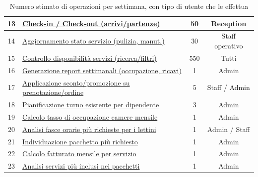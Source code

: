 \documentclass[a4paper,12pt]{report}
\begin{document}
\begin{table}[H]
\begin{tabularx}{\textwidth}{|c|>{\raggedright\arraybackslash}X|c|c|}
		\hline
		13          & \hyperref[op13]{Check-in / Check-out (arrivi/partenze)}                & 50                & Reception              \\
		\hline
		14          & \hyperref[op14]{Aggiornamento stato servizio (pulizia, manut.)}        & 30                & Staff operativo        \\
		\hline
		15          & \hyperref[op15]{Controllo disponibilità servizi (ricerca/filtri)}      & 550               & Tutti                  \\
		\hline
		16          & \hyperref[op16]{Generazione report settimanali (occupazione, ricavi)}  & 1                 & Admin                  \\
		\hline
		17          & \hyperref[op17]{Applicazione sconto/promozione su prenotazione/ordine} & 5                 & Staff / Admin          \\
		\hline
		18          & \hyperref[op18]{Pianificazione turno esistente per dipendente}         & 3                 & Admin                  \\
		\hline
		19          & \hyperref[op19]{Calcolo tasso di occupazione camere mensile}           & 1                 & Admin                  \\
		\hline
		20          & \hyperref[op20]{Analisi fasce orarie più richieste per i lettini}      & 1                 & Admin / Staff          \\
		\hline
		21          & \hyperref[op21]{Individuazione pacchetto più richiesto}                & 1                 & Admin                  \\
		\hline
		22          & \hyperref[op22]{Calcolo fatturato mensile per servizio}                & 1                 & Admin                  \\
		\hline
		23          & \hyperref[op23]{Analisi servizi più inclusi nei pacchetti}             & 1                 & Admin                  \\
		\hline
	\end{tabularx}
	\caption{Numero stimato di operazioni per settimana, con tipo di utente che le effettua}
	\label{tab:operazioni-settimanali}
\end{table}

\newpage
\end{document}
